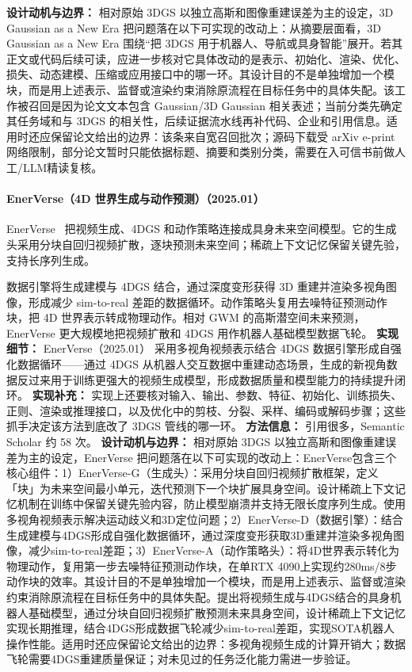 \textbf{设计动机与边界：} 相对原始 3DGS 以独立高斯和图像重建误差为主的设定，3D Gaussian as a New Era 把问题落在以下可实现的改动上：从摘要层面看，3D Gaussian as a New Era 围绕“把 3DGS 用于机器人、导航或具身智能”展开。若其正文或代码后续可读，应进一步核对它具体改动的是表示、初始化、渲染、优化、损失、动态建模、压缩或应用接口中的哪一环。其设计目的不是单独增加一个模块，而是用上述表示、监督或渲染约束消除原流程在目标任务中的具体失配。该工作被召回是因为论文文本包含 Gaussian/3D Gaussian 相关表述；当前分类先确定其任务域和与 3DGS 的相关性，后续证据流水线再补代码、企业和引用信息。适用时还应保留论文给出的边界：该条来自宽召回批次；源码下载受 arXiv e-print 网络限制，部分论文暂时只能依据标题、摘要和类别分类，需要在入可信书前做人工/LLM精读复核。
\paragraph{EnerVerse（4D 世界生成与动作预测）（2025.01）}
EnerVerse~\cite{2501_01895} 把视频生成、4DGS 和动作策略连接成具身未来空间模型。它的生成头采用分块自回归视频扩散，逐块预测未来空间；稀疏上下文记忆保留关键先验，支持长序列生成。

数据引擎将生成建模与 4DGS 结合，通过深度变形获得 3D 重建并渲染多视角图像，形成减少 sim-to-real 差距的数据循环。动作策略头复用去噪特征预测动作块，把 4D 世界表示转成物理动作。相对 GWM 的高斯潜空间未来预测，EnerVerse 更大规模地把视频扩散和 4DGS 用作机器人基础模型数据飞轮。
\textbf{实现细节：} EnerVerse（2025.01） 采用多视角视频表示结合 4DGS 数据引擎形成自强化数据循环——通过 4DGS 从机器人交互数据中重建动态场景，生成的新视角数据反过来用于训练更强大的视频生成模型，形成数据质量和模型能力的持续提升闭环。
\textbf{实现补充：} 实现上还要核对输入、输出、参数、特征、初始化、训练损失、正则、渲染或推理接口，以及优化中的剪枝、分裂、采样、编码或解码步骤；这些抓手决定该方法到底改了 3DGS 管线的哪一环。
\textbf{方法信息：} 引用很多，Semantic Scholar 约 58 次。
\textbf{设计动机与边界：} 相对原始 3DGS 以独立高斯和图像重建误差为主的设定，EnerVerse 把问题落在以下可实现的改动上：EnerVerse包含三个核心组件：1）EnerVerse-G（生成头）：采用分块自回归视频扩散框架，定义「块」为未来空间最小单元，迭代预测下一个块扩展具身空间。设计稀疏上下文记忆机制在训练中保留关键先验内容，防止模型崩溃并支持无限长度序列生成。使用多视角视频表示解决运动歧义和3D定位问题；2）EnerVerse-D（数据引擎）：结合生成建模与4DGS形成自强化数据循环，通过深度变形获取3D重建并渲染多视角图像，减少sim-to-real差距；3）EnerVerse-A（动作策略头）：将4D世界表示转化为物理动作，复用第一步去噪特征预测动作块，在单RTX 4090上实现约280ms/8步动作块的效率。其设计目的不是单独增加一个模块，而是用上述表示、监督或渲染约束消除原流程在目标任务中的具体失配。提出将视频生成与4DGS结合的具身机器人基础模型，通过分块自回归视频扩散预测未来具身空间，设计稀疏上下文记忆实现长期推理，结合4DGS形成数据飞轮减少sim-to-real差距，实现SOTA机器人操作性能。适用时还应保留论文给出的边界：多视角视频生成的计算开销大；数据飞轮需要4DGS重建质量保证；对未见过的任务泛化能力需进一步验证。
